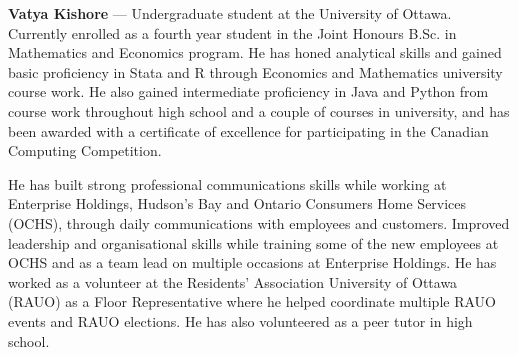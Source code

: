 \textbf{Vatya Kishore} — Undergraduate student at the University of Ottawa. Currently enrolled as a fourth year student in the Joint Honours B.Sc. in Mathematics and Economics program. He has honed analytical skills and gained basic proficiency in Stata and R through Economics and Mathematics university course work. He also gained intermediate proficiency in Java and Python from course work throughout high school and a couple of courses in university, and has been awarded with a certificate of excellence for participating in the Canadian Computing Competition.\par He has built strong professional communications skills while working at Enterprise Holdings, Hudson's Bay and Ontario Consumers Home Services (OCHS), through daily communications with employees and customers. Improved leadership and organisational skills while training some of the new employees at OCHS and as a team lead on multiple occasions at Enterprise Holdings. He has worked as a volunteer at the Residents’ Association University of Ottawa (RAUO) as a Floor Representative where he helped coordinate multiple RAUO events and RAUO elections. He has also volunteered as a peer tutor in high school.